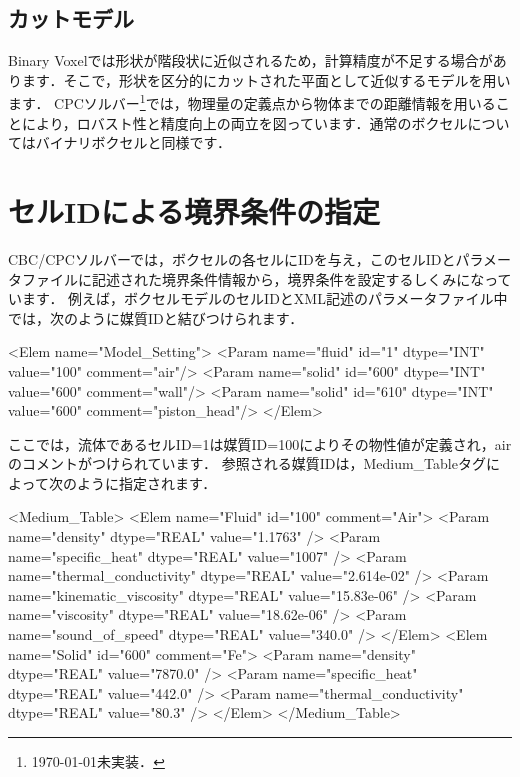 \subsection{カットモデル}
\label{sec:planar cut}
Binary Voxelでは形状が階段状に近似されるため，計算精度が不足する場合があります．そこで，形状を区分的にカットされた平面として近似するモデルを用います．
CPCソルバー\footnote{\today 未実装．}では，物理量の定義点から物体までの距離情報を用いることにより，ロバスト性と精度向上の両立を図っています．通常のボクセルについてはバイナリボクセルと同様です．


%
\section{セルIDによる境界条件の指定}
\label{sec:ID connection}

CBC/CPCソルバーでは，ボクセルの各セルにIDを与え，このセルIDとパラメータファイルに記述された境界条件情報から，境界条件を設定するしくみになっています．
例えば，ボクセルモデルのセルIDとXML記述のパラメータファイル中では，次のように媒質IDと結びつけられます．

{\small
\begin{program}
<Elem name="Model_Setting">
  <Param name="fluid" id="1"   dtype="INT" value="100" comment="air"/>
  <Param name="solid" id="600" dtype="INT" value="600" comment="wall"/>
  <Param name="solid" id="610" dtype="INT" value="600" comment="piston_head"/>
</Elem>
\end{program}
}

\noindent ここでは，流体であるセルID=1は媒質ID=100によりその物性値が定義され，airのコメントがつけられています．
参照される媒質IDは，Medium\_Tableタグによって次のように指定されます．

{\small
\begin{program}
<Medium_Table>
  <Elem name="Fluid" id="100" comment="Air">
    <Param name="density"              dtype="REAL" value="1.1763" />
    <Param name="specific_heat"        dtype="REAL" value="1007" />
    <Param name="thermal_conductivity" dtype="REAL" value="2.614e-02" />
    <Param name="kinematic_viscosity"  dtype="REAL" value="15.83e-06" />
    <Param name="viscosity"            dtype="REAL" value="18.62e-06" />
    <Param name="sound_of_speed"       dtype="REAL" value="340.0" />
  </Elem>
  <Elem name="Solid" id="600" comment="Fe">
    <Param name="density"              dtype="REAL" value="7870.0" />
    <Param name="specific_heat"        dtype="REAL" value="442.0" />
    <Param name="thermal_conductivity" dtype="REAL" value="80.3" />
  </Elem>
</Medium_Table>
\end{program}
}

